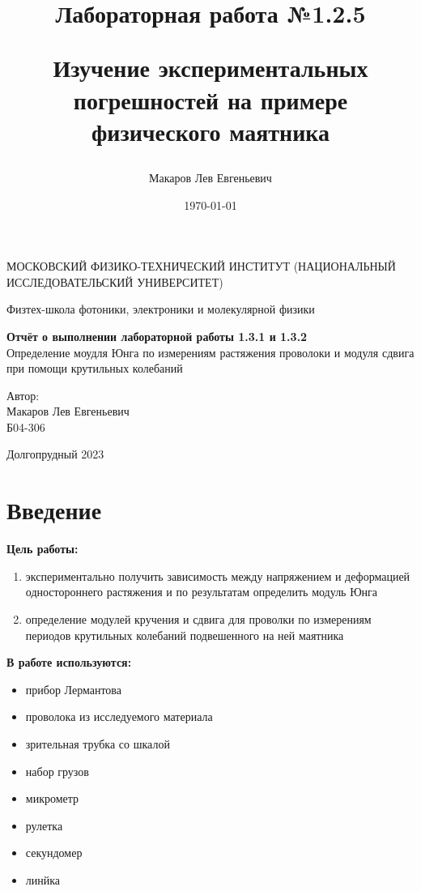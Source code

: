 \documentclass[a4paper,12pt]{article}
\author{Макаров Лев Евгеньевич}
\title{Лабораторная работа №1.2.5

Изучение экспериментальных погрешностей на примере физического маятника
}
\date{\today}
\begin{document}
\begin{titlepage}
	\begin{center}
		{\large МОСКОВСКИЙ ФИЗИКО-ТЕХНИЧЕСКИЙ ИНСТИТУТ (НАЦИОНАЛЬНЫЙ ИССЛЕДОВАТЕЛЬСКИЙ УНИВЕРСИТЕТ)}
	\end{center}
	\begin{center}
		{\large Физтех-школа фотоники, электроники и молекулярной физики}
	\end{center}
	
	
	\vspace{4.5cm}
	{\huge
		\begin{center}
			{\bf Отчёт о выполнении лабораторной работы 1.3.1 и 1.3.2}\\
			Определение моудля Юнга по измерениям растяжения проволоки и модуля сдвига при помощи крутильных колебаний
		\end{center}
	}
	\vspace{2cm}
	\begin{flushright}
		{\LARGE Автор:\\ Макаров Лев Евгеньевич \\
			\vspace{0.2cm}
			Б04-306}
	\end{flushright}
	\vspace{8cm}
	\begin{center}
		Долгопрудный 2023
	\end{center}
\end{titlepage}

\section{Введение}

\textbf{Цель работы:} 
\begin{enumerate}
	\item экспериментально получить зависимость между напряжением и деформацией одностороннего растяжения и по результатам определить модуль Юнга
    \item определение модулей кручения и сдвига для проволки по измерениям периодов крутильных колебаний подвешенного на ней маятника
\end{enumerate}

\textbf{В работе используются:} 
\begin{itemize}
    \item прибор Лермантова
    \item проволока из исследуемого материала
    \item зрительная трубка со шкалой
    \item набор грузов
    \item микрометр
    \item рулетка
    \item секундомер
    \item линйка
\end{itemize}
\medskip
\end{document}
